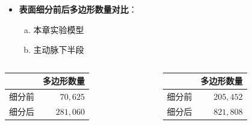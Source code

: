 \begin{frame}
\begin{itemize}
  \item \textbf{表面细分前后多边形数量对比}：
  \begin{enumerate}[(a)]
    \item 本章实验模型
    \item 主动脉下半段
  \end{enumerate}
\end{itemize}
\begin{table}[t]
\renewcommand{\arraystretch}{0.5}
\centering
\begin{columns}[b,onlytextwidth]
\begin{column}{.5\textwidth}
\centering
\begin{tabular*}{35mm}{lr}
\toprule
~              & \small{多边形数量} \\
\midrule
\small{细分前} & \small{$70,625$}     \\
\midrule
\small{细分后} & \small{$281,060$}    \\
\bottomrule
\end{tabular*}
\end{column}
\begin{column}{.5\textwidth}
\centering
\begin{tabular*}{35mm}{lr}
\toprule
~              & \small{多边形数量} \\
\midrule
\small{细分前} & \small{$205,452$}    \\
\midrule
\small{细分后} & \small{$821,808$}    \\
\bottomrule
\end{tabular*}
\end{column}
\end{columns}
\end{table}
\end{frame} 

